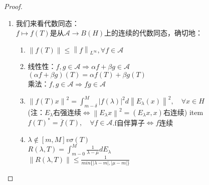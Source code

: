 \documentclass[12pt, a4paper, oneside]{ctexbook}
\begin{document}
\begin{proof}
\begin{enumerate}
	\item 我们来看代数同态：\\
	$f\mapsto f(T)$是从$\mathscr{A}\to B(H)$上的连续的代数同态，确切地：\begin{enumerate}
		\item $\left \| f(T)\right \|\leqslant \left \| f\right \|_{L^{\infty}},\forall f\in \mathscr{A}$
		\item 线性性：$f,g\in \mathscr{A} \Rightarrow \alpha f+\beta g\in \mathscr{A}$\\
		$(\alpha f+\beta g)(T)=\alpha f(T)+\beta g(T)$\\
		乘法：$f,g\in \mathscr{A}\Rightarrow fg\in \mathscr{A}$
		\item $\left \| f(T)x\right \|^2=\int_{m-\delta }^{M}\left | f(\lambda)\right |^2d\left \| E_{\lambda}(x)\right \|^2,\quad \forall x\in H$\\
		(注：$E_{\lambda}$右强连续$\Leftrightarrow \left \| E_{\lambda }x\right \|^2=(E_{\lambda }x,x)$右连续)
		item $f(T)^*=\overline{f}(T),\quad \forall f\in \mathscr{A}$.f自伴算子$\Leftrightarrow f$连续
		\item $\lambda \notin [m,M] v\sigma (T)$\\
		$R(\lambda,T)=\int_{m-0}^{M}\frac{1}{\lambda-\mu}dE_{\lambda}$\\
		$\left \| R(\lambda,T)\right \|\leq \frac{1}{min\{\left | \lambda-m\right |,\left | \mu-m\right |\}}$
	\end{enumerate}


\end{enumerate}
\end{proof}
\end{document}
